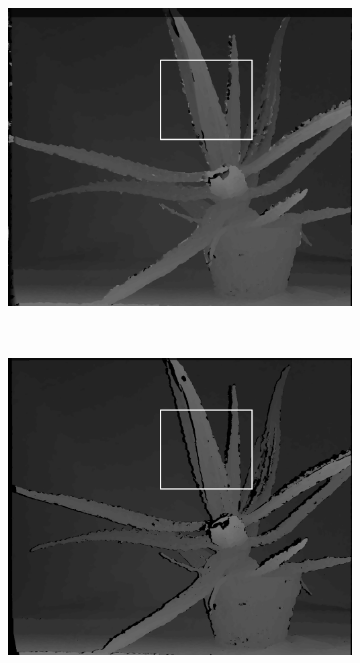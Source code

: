 \begin{figure}

  \begin{subfigure}[b]{0.48\textwidth}
    \centering
    \includegraphics[width=\textwidth]{images/normal.png}
  \end{subfigure}
  ~
  \begin{subfigure}[b]{0.48\textwidth}
    \centering
    \includegraphics[width=\textwidth]{images/no-fill.png}
  \end{subfigure}


\end{figure}
